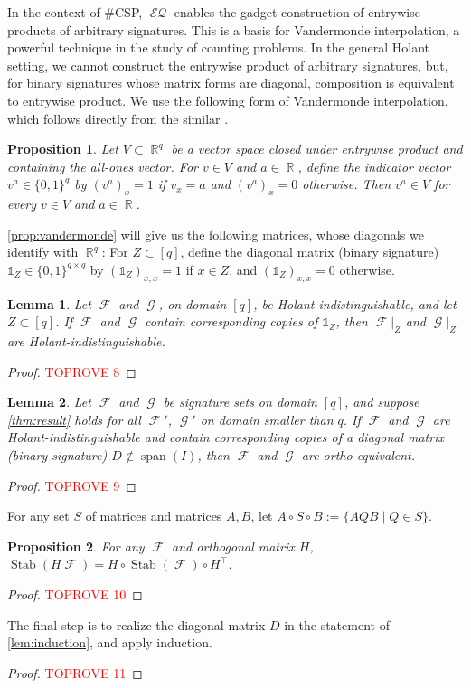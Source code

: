\documentclass{article}
\newtheorem{proposition}{Proposition}[section]
\newtheorem{lemma}{Lemma}[section]
\theoremstyle{remark}
\theoremstyle{definition}
\DeclareMathOperator{\spn}{span}
\DeclareMathOperator{\rr}{\mathbb{R}}
\DeclareMathOperator{\fc}{\mathcal{F}}
\DeclareMathOperator{\gc}{\mathcal{G}}
\DeclareMathOperator{\stab}{Stab}
\DeclareMathOperator{\eq}{\mathcal{EQ}}
\begin{document}
In the context of \#CSP, $\eq$ enables the gadget-construction of entrywise 
products of arbitrary signatures. This is a basis for Vandermonde interpolation, a powerful 
technique in the study of counting problems.
In the general Holant setting, we cannot construct the entrywise product of arbitrary signatures,
but, for binary signatures whose matrix forms are diagonal, composition is equivalent to entrywise
product. We use the following form of Vandermonde interpolation, which follows directly from the similar
\cite[Lemma 2.3]{grohe_homomorphism_2022}.
\begin{proposition}
    \label{prop:vandermonde}
    Let $V \subset \rr^q$ be a vector space closed under entrywise product and containing the
    all-ones vector. For $v \in V$ and $a \in \rr$, define the indicator vector $v^a \in \{0,1\}^q$ by
    $(v^a)_x = 1$ if $v_x = a$ and $(v^a)_x = 0$ otherwise. Then $v^a \in V$ for every
    $v \in V$ and $a \in \rr$.
\end{proposition}
\autoref{prop:vandermonde} will give us the following matrices, whose diagonals we identify
with $\rr^q$:
For $Z \subset [q]$, define the diagonal matrix (binary signature)
$\mathds{1}_Z \in \{0,1\}^{q \times q}$ by $(\mathds{1}_Z)_{x,x} = 1$ if $x \in Z$, and $(\mathds{1}_Z)_{x,x} = 0$ otherwise.
\begin{lemma}
    \label{lem:restriction}
    Let $\fc$ and $\gc$, on domain $[q]$, be Holant-indistinguishable, and let $Z \subset [q]$. If $\fc$ and
    $\gc$ contain corresponding copies of $\mathds{1}_Z$, then $\fc|_Z$ and $\gc|_Z$ are 
    Holant-indistinguishable.
\end{lemma}
\begin{proof}\textcolor{red}{TOPROVE 8}\end{proof}

\begin{lemma}
    \label{lem:induction}
    Let $\fc$ and $\gc$ be signature sets on domain $[q]$, and suppose \autoref{thm:result} holds for
    all $\fc'$, $\gc'$ on domain smaller than $q$. If $\fc$ and $\gc$ are Holant-indistinguishable
    and contain corresponding copies of a diagonal matrix (binary signature)
    $D \not\in \spn(I)$, then $\fc$ and $\gc$ are ortho-equivalent. 
\end{lemma}
\begin{proof}\textcolor{red}{TOPROVE 9}\end{proof}

For any set $S$ of matrices and matrices $A,B$, let $A \circ S \circ B := \{A  Q  B \mid Q \in S\}$.
\begin{proposition}
    For any $\fc$ and orthogonal matrix $H$, 
    $\stab(H\fc) = H \circ \stab(\fc) \circ H^\top$.
    \label{prop:stabbasis}
\end{proposition}
\begin{proof}\textcolor{red}{TOPROVE 10}\end{proof}
The final step is to realize the diagonal matrix $D$ in the statement of \autoref{lem:induction}, and
apply induction.
\begin{proof}\textcolor{red}{TOPROVE 11}\end{proof} 
\end{document}
